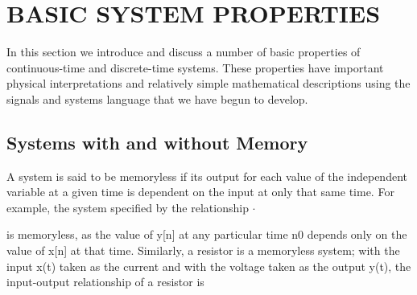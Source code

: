 \documentclass{report}
\newcommand{\unicode}[1]{{}}
\begin{document}
\begin{doublespace}
{{${``}91dddb38-0015-4fff-ae4b-d00ba63cd2c3$\backslash ${''}]$\unicode{f7c0}\texttt{"}$}\},}\\
\pmb{ 0.5, 20,\text{Appearance}\to \text{{``}Labeled{''}}\}]}\\
\pmb{}\\
\pmb{\text{As} \text{long} \text{as} \text{the} \text{sampling} \text{frequency} \text{verifies} \text{the} \text{Nyquist}-\text{Shannon} \text{condition},\text{we}
\text{can} \text{reconstruct} \text{the} \text{original} \text{signal} \text{without} \text{distortion}.}\\
\pmb{\text{Further} \text{Explorations}}\\
\pmb{\text{Digital} \text{Signal} \text{Processing}}\\
\pmb{\text{Analog} \text{and} \text{Digital} \text{Modulation} \text{Techniques}}\\
\pmb{\text{Authorship} \text{information}}\\
\pmb{\text{Ghassane} \text{Aniba}}\\
\pmb{23 \text{June} 2017}\\
\pmb{\text{ghassane}@\text{emi}.\text{ac}.\text{ma}}\)
\end{doublespace}

\section*{BASIC SYSTEM PROPERTIES}

In this section we introduce and discuss a number of basic properties of continuous-time and discrete-time systems. These properties have important
physical interpretations and relatively simple mathematical descriptions using the signals and systems language that we have begun to develop.

\subsection*{Systems with and without Memory}

A system is said to be memoryless if its output for each value of the independent variable at a given time is dependent on the input at only that
same time. For example, the system specified by the relationship $\cdot $



is memoryless, as the value of y[n] at any particular time n0 depends only on the value of x[n] at that time. Similarly, a resistor is a memoryless
system; with the input x(t) taken as the current and with the voltage taken as the output y(t), the input-output relationship of a resistor is
\end{document}
